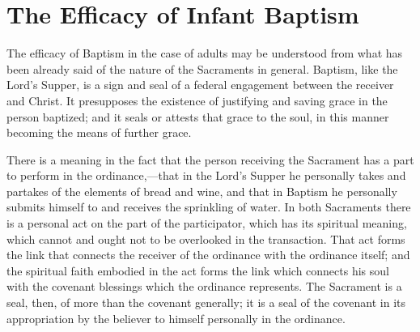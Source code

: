 \documentclass[
  english,
]{book}
\begin{document}
\hypertarget{the-efficacy-of-infant-baptism}{%
\section{The Efficacy of Infant Baptism}\label{the-efficacy-of-infant-baptism}}

The efficacy of Baptism in the case of adults may be understood from what has been already said of the nature of the Sacraments in general. Baptism, like the Lord's Supper, is a sign and seal of a federal engagement between the receiver and Christ. It presupposes the existence of justifying and saving grace in the person baptized; and it seals or attests that grace to the soul, in this manner becoming the means of further grace.

There is a meaning in the fact that the person receiving the Sacrament has a part to perform in the ordinance,---that in the Lord's Supper he personally takes and partakes of the elements of bread and wine, and that in Baptism he personally submits himself to and receives the sprinkling of water. In both Sacraments there is a personal act on the part of the participator, which has its spiritual meaning, which cannot and ought not to be overlooked in the transaction. That act forms the link that connects the receiver of the ordinance with the ordinance itself; and the spiritual faith embodied in the act forms the link which connects his soul with the covenant blessings which the ordinance represents. The Sacrament is a seal, then, of more than the covenant generally; it is a seal of the covenant in its appropriation by the believer to himself personally in the ordinance.
\end{document}
